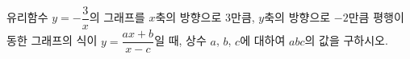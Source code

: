 유리함수 $y=-\dfrac{3}{x}$의 그래프를 $x$축의 방향으로 $3$만큼, $y$축의 방향으로 $-2$만큼 평행이동한 그래프의 식이 $y=\dfrac{ax+b}{x-c}$일 때, 상수 $a$, $b$, $c$에 대하여 $abc$의 값을 구하시오.
